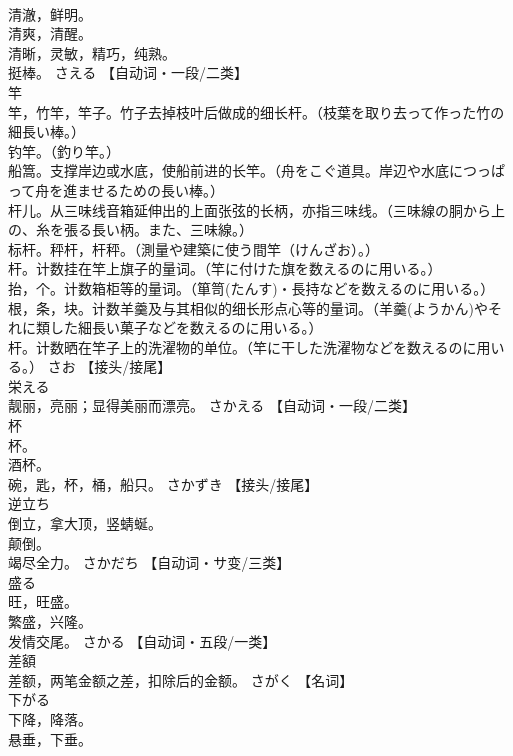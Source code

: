 \documentclass[8pt]{extreport}
\begin{document}
\begin{CJK}{UTF8}{min}
\\	清澈，鲜明。 
\\	清爽，清醒。 
\\	清晰，灵敏，精巧，纯熟。 
\\	挺棒。	さえる		【自动词・一段/二类】
\\	竿	
\\	竿，竹竿，竿子。竹子去掉枝叶后做成的细长杆。（枝葉を取り去って作った竹の細長い棒。） 
\\	钓竿。（釣り竿。） 
\\	船篙。支撑岸边或水底，使船前进的长竿。（舟をこぐ道具。岸辺や水底につっぱって舟を進ませるための長い棒。） 
\\	杆儿。从三味线音箱延伸出的上面张弦的长柄，亦指三味线。（三味線の胴から上の、糸を張る長い柄。また、三味線。） 
\\	标杆。秤杆，杆秤。（測量や建築に使う間竿（けんざお）。） 
\\	杆。计数挂在竿上旗子的量词。（竿に付けた旗を数えるのに用いる。） 
\\	抬，个。计数箱柜等的量词。（箪笥(たんす)・長持などを数えるのに用いる。） 
\\	根，条，块。计数羊羹及与其相似的细长形点心等的量词。（羊羹(ようかん)やそれに類した細長い菓子などを数えるのに用いる。） 
\\	杆。计数晒在竿子上的洗濯物的单位。（竿に干した洗濯物などを数えるのに用いる。）	さお		【接头/接尾】
\\	栄える	
\\	靓丽，亮丽；显得美丽而漂亮。	さかえる		【自动词・一段/二类】
\\	杯	
\\	杯。 
\\	酒杯。 
\\	碗，匙，杯，桶，船只。	さかずき		【接头/接尾】
\\	逆立ち	
\\	倒立，拿大顶，竖蜻蜒。 
\\	颠倒。 
\\	竭尽全力。	さかだち		【自动词・サ变/三类】
\\	盛る	
\\	旺，旺盛。 
\\	繁盛，兴隆。 
\\	发情交尾。	さかる		【自动词・五段/一类】
\\	差額	
\\	差额，两笔金额之差，扣除后的金额。	さがく		【名词】
\\	下がる	
\\	下降，降落。 
\\	悬垂，下垂。 

\end{CJK}
\end{document}
